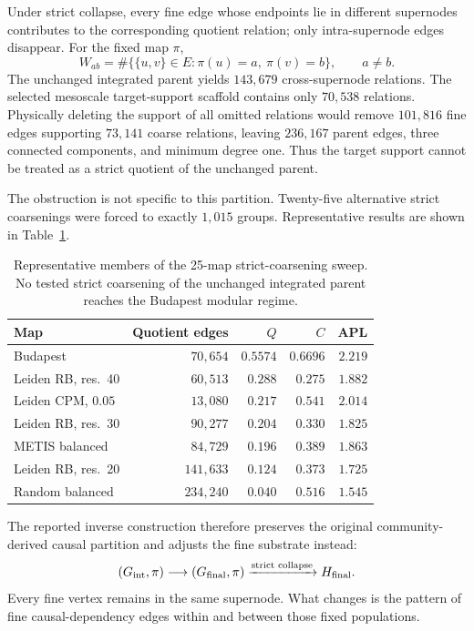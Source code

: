 \documentclass[12pt]{article}
\begin{document}
Under strict collapse, every fine edge whose endpoints lie in different
supernodes contributes to the corresponding quotient relation; only
intra-supernode edges disappear.  For the fixed map \(\pi\),
\[
W_{ab}=\#\{\{u,v\}\in E:\pi(u)=a,\ \pi(v)=b\},\qquad a\neq b.
\]
The unchanged integrated parent yields \(143{,}679\) cross-supernode
relations.  The selected mesoscale target-support scaffold contains only
\(70{,}538\) relations.  Physically deleting the support of all omitted
relations would remove \(101{,}816\) fine edges supporting \(73{,}141\)
coarse relations, leaving \(236{,}167\) parent edges, three connected
components, and minimum degree one.  Thus the target support cannot be treated
as a strict quotient of the unchanged parent.

The obstruction is not specific to this partition.  Twenty-five alternative
strict coarsenings were forced to exactly \(1{,}015\) groups.  Representative
results are shown in Table~\ref{tab:strict-coarsening-sweep}.

\begin{table}[H]
\centering
\small
\begin{tabular}{lrrrr}
\toprule
Map & Quotient edges & \(Q\) & \(C\) & APL\\
\midrule
Budapest & \(70{,}654\) & \(0.5574\) & \(0.6696\) & \(2.219\)\\
Leiden RB, res.~40 & \(60{,}513\) & \(0.288\) & \(0.275\) & \(1.882\)\\
Leiden CPM, \(0.05\) & \(13{,}080\) & \(0.217\) & \(0.541\) & \(2.014\)\\
Leiden RB, res.~30 & \(90{,}277\) & \(0.204\) & \(0.330\) & \(1.825\)\\
METIS balanced & \(84{,}729\) & \(0.196\) & \(0.389\) & \(1.863\)\\
Leiden RB, res.~20 & \(141{,}633\) & \(0.124\) & \(0.373\) & \(1.725\)\\
Random balanced & \(234{,}240\) & \(0.040\) & \(0.516\) & \(1.545\)\\
\bottomrule
\end{tabular}
\caption{Representative members of the 25-map strict-coarsening sweep.  No tested strict coarsening of the unchanged integrated parent reaches the Budapest modular regime.}
\label{tab:strict-coarsening-sweep}
\end{table}

The reported inverse construction therefore preserves the original
community-derived causal partition and adjusts the fine substrate instead:
\[
(G_{\rm int},\pi)\longrightarrow(G_{\rm final},\pi)
\xrightarrow{\text{strict collapse}}H_{\rm final}.
\]
Every fine vertex remains in the same supernode.  What changes is the pattern
of fine causal-dependency edges within and between those fixed populations.
\end{document}
